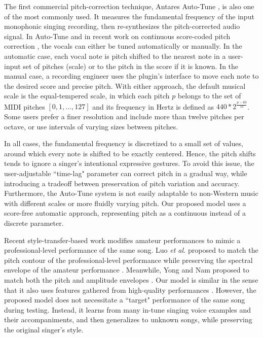 The first commercial pitch-correction technique, Antares Auto-Tune \cite{antares:2016}, is also one of the most commonly used. It measures the fundamental frequency of the input monophonic singing recording, then re-synthesizes the pitch-corrected audio signal. In Auto-Tune and in recent work on continuous score-coded pitch correction \cite{salazar2015continuous}, the vocals can either be tuned automatically or manually. In the automatic case, each vocal note is pitch shifted to the nearest note in a user-input set of pitches (scale) or to the pitch in the score if it is known. In the manual case, a recording engineer uses the plugin's interface to move each note to the desired score and precise pitch. With either approach, the default musical scale is the equal-tempered scale, in which each pitch $p$ belongs to the set of MIDI pitches $[0, 1, ..., 127]$ and its frequency in Hertz is defined as $440*2^{\frac{p-69}{12}}$. Some users prefer a finer resolution and include more than twelve pitches per octave, or use intervals of varying sizes between pitches. 

In all cases, the fundamental frequency is discretized to a small set of values, around which every note is shifted to be exactly centered. Hence, the pitch shifts tends to ignore a singer's intentional expressive gestures. To avoid this issue, the user-adjustable ``time-lag" parameter can correct pitch in a gradual way, while introducing a tradeoff between preservation of pitch variation and accuracy. Furthermore, the Auto-Tune system is not easily adaptable to non-Western music with different scales or more fluidly varying pitch. Our proposed model uses a score-free automatic approach, representing pitch as a continuous instead of a discrete parameter.

Recent style-transfer-based work modifies amateur performances to mimic a professional-level performance of the same song. Luo \textit{et al.} proposed to match the pitch contour of the professional-level performance while preserving the spectral envelope of the amateur performance \cite{luo2018singing}. Meanwhile, Yong and Nam proposed to match both the pitch and amplitude envelopes \cite{yong2018singing}. Our model is similar in the sense that it also uses features gathered from high-quality performances \cite{wager2018intonation}. However, the proposed model does not necessitate a ``target" performance of the same song during testing. Instead, it learns from many in-tune singing voice examples and their accompaniments, and then generalizes to unknown songs, while preserving the original singer's style.

